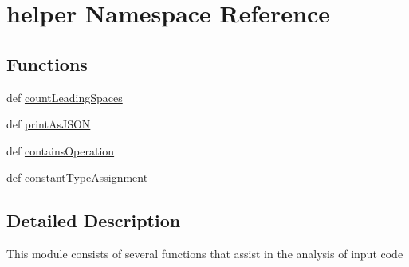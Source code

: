 \hypertarget{namespacehelper}{\section{helper Namespace Reference}
\label{namespacehelper}
}
\subsection*{Functions}
\begin{DoxyCompactItemize}
\item 
def \hyperlink{namespacehelper_a3d373960e19a1cccb14a3ea3d8a290fc}{count\-Leading\-Spaces}
\item 
def \hyperlink{namespacehelper_ac9982ec8fcc3a8754106f2887acde288}{print\-As\-J\-S\-O\-N}
\item 
def \hyperlink{namespacehelper_a83cee7332076af713f97e0c60fd42846}{contains\-Operation}
\item 
def \hyperlink{namespacehelper_a9f40a6844855f772047a1f45f3a6d00e}{constant\-Type\-Assignment}
\end{DoxyCompactItemize}


\subsection{Detailed Description}
\begin{DoxyVerb}This module consists of several functions that assist in the analysis of input code
\end{DoxyVerb}
 

